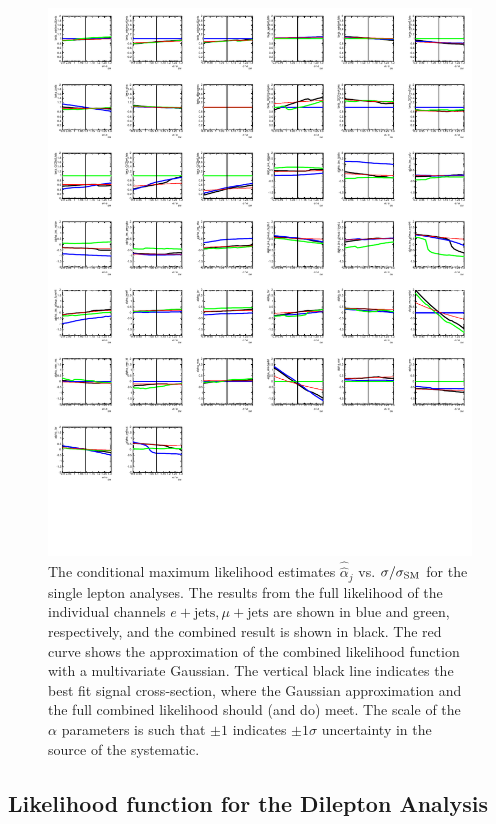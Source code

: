 \begin{figure}[htbp]
  \begin{center}
    \includegraphics[width=.8\textwidth]{figures/comb/LJetsProfilePlots}
    \caption{The conditional maximum likelihood estimates $\hat{\hat{\alpha}}_j$ vs. $\sigma/\sigma_{\rm SM}$ for the single lepton analyses.  The results from the full likelihood of the individual channels $e+\textrm{jets}, \mu+\textrm{jets}$ are shown in blue and green, respectively, and the combined result is shown in black.  The red curve shows the approximation of the combined likelihood function with a multivariate Gaussian.  The vertical black line indicates the best fit signal cross-section, where the Gaussian approximation and the full combined likelihood should (and do) meet.  The scale of the $\alpha$ parameters is such that $\pm 1$ indicates $\pm 1\sigma$ uncertainty in the source of the systematic.}
    \label{fig:ljets_profile}
  \end{center}
\end{figure}





\subsection{Likelihood function for the Dilepton Analysis}
\label{sec:dilep}

